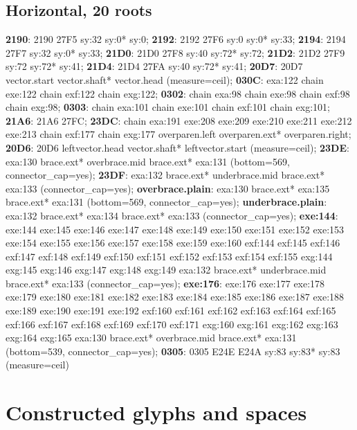 \subsection*{Horizontal, 20 roots}
\raggedright\small \textbf{2190}: 2190 27F5 \textbar{} sy:32 sy:0* sy:0;
\textbf{2192}: 2192 27F6 \textbar{} sy:0 sy:0* sy:33; \textbf{2194}: 2194 27F7
\textbar{} sy:32 sy:0* sy:33; \textbf{21D0}: 21D0 27F8 \textbar{} sy:40 sy:72*
sy:72; \textbf{21D2}: 21D2 27F9 \textbar{} sy:72 sy:72* sy:41; \textbf{21D4}:
21D4 27FA \textbar{} sy:40 sy:72* sy:41; \textbf{20D7}: 20D7 \textbar{}
vector.start vector.shaft* vector.head (measure=ceil); \textbf{030C}: exa:122
chain exe:122 chain exf:122 chain exg:122; \textbf{0302}: chain exa:98 chain
exe:98 chain exf:98 chain exg:98; \textbf{0303}: chain exa:101 chain exe:101
chain exf:101 chain exg:101; \textbf{21A6}: 21A6 27FC; \textbf{23DC}: chain
exa:191 exe:208 exe:209 exe:210 exe:211 exe:212 exe:213 chain exf:177 chain
exg:177 \textbar{} overparen.left overparen.ext* overparen.right;
\textbf{20D6}: 20D6 \textbar{} leftvector.head vector.shaft* leftvector.start
(measure=ceil); \textbf{23DE}:  \textbar{} exa:130 brace.ext* overbrace.mid
brace.ext* exa:131 (bottom=569, connector\_cap=yes); \textbf{23DF}:  \textbar{}
exa:132 brace.ext* underbrace.mid brace.ext* exa:133 (connector\_cap=yes);
\textbf{overbrace.plain}:  \textbar{} exa:130 brace.ext* exa:135 brace.ext*
exa:131 (bottom=569, connector\_cap=yes); \textbf{underbrace.plain}:
\textbar{} exa:132 brace.ext* exa:134 brace.ext* exa:133 (connector\_cap=yes);
\textbf{exe:144}: exe:144 exe:145 exe:146 exe:147 exe:148 exe:149 exe:150
exe:151 exe:152 exe:153 exe:154 exe:155 exe:156 exe:157 exe:158 exe:159 exe:160
exf:144 exf:145 exf:146 exf:147 exf:148 exf:149 exf:150 exf:151 exf:152 exf:153
exf:154 exf:155 exg:144 exg:145 exg:146 exg:147 exg:148 exg:149 \textbar{}
exa:132 brace.ext* underbrace.mid brace.ext* exa:133 (connector\_cap=yes);
\textbf{exe:176}: exe:176 exe:177 exe:178 exe:179 exe:180 exe:181 exe:182
exe:183 exe:184 exe:185 exe:186 exe:187 exe:188 exe:189 exe:190 exe:191 exe:192
exf:160 exf:161 exf:162 exf:163 exf:164 exf:165 exf:166 exf:167 exf:168 exf:169
exf:170 exf:171 exg:160 exg:161 exg:162 exg:163 exg:164 exg:165 \textbar{}
exa:130 brace.ext* overbrace.mid brace.ext* exa:131 (bottom=539,
connector\_cap=yes); \textbf{0305}: 0305 E24E E24A \textbar{} sy:83 sy:83*
sy:83 (measure=ceil)\par

\section{Constructed glyphs and spaces}\label{app:constructed}

